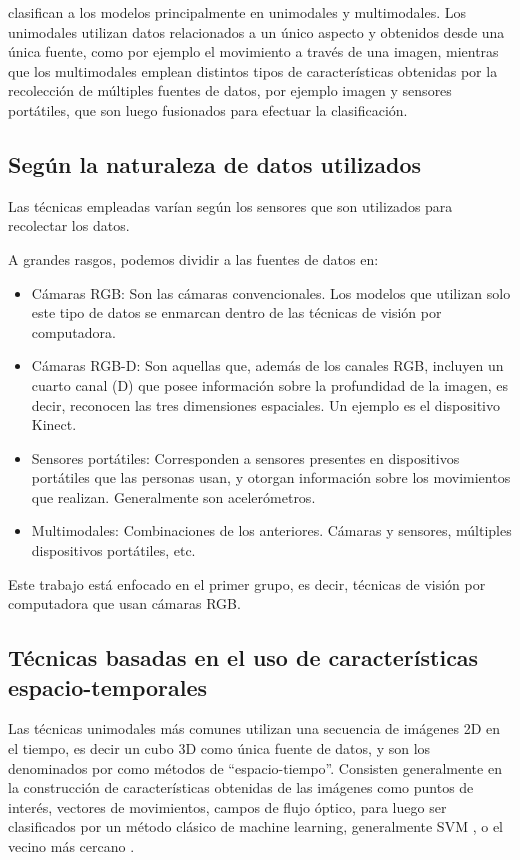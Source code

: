 \citep{Vrigkas2015} clasifican a los modelos principalmente en unimodales y multimodales. Los unimodales utilizan datos relacionados a un único aspecto y obtenidos desde una única fuente, como por ejemplo el movimiento a través de una imagen, mientras que los multimodales emplean distintos tipos de características obtenidas por la recolección de múltiples fuentes de datos, por ejemplo imagen y sensores portátiles, que son luego fusionados para efectuar la clasificación.

\subsection{Según la naturaleza de datos utilizados}

Las técnicas empleadas varían según los sensores que son utilizados para recolectar los datos.

A grandes rasgos, podemos dividir a las fuentes de datos en:

\begin{itemize}
	\item Cámaras RGB: Son las cámaras convencionales. Los modelos que utilizan solo este tipo de datos se enmarcan dentro de las técnicas de visión por computadora.
	\item Cámaras RGB-D: Son aquellas que, además de los canales RGB, incluyen un cuarto canal (D) que posee información sobre la profundidad de la imagen, es decir, reconocen las tres dimensiones espaciales. Un ejemplo es el dispositivo Kinect.
	\item Sensores portátiles: Corresponden a sensores presentes en dispositivos portátiles que las personas usan, y otorgan información sobre los movimientos que realizan. Generalmente son acelerómetros.
	\item Multimodales: Combinaciones de los anteriores. Cámaras y sensores, múltiples dispositivos portátiles, etc. \citep{Yadav2021}
\end{itemize}

Este trabajo está enfocado en el primer grupo, es decir, técnicas de visión por computadora que usan cámaras RGB.

\subsection{Técnicas basadas en el uso de características espacio-temporales}

Las técnicas unimodales más comunes utilizan una secuencia de imágenes 2D en el tiempo, es decir un cubo 3D como única fuente de datos, y son los denominados por \citep{Vrigkas2015} como métodos de “espacio-tiempo”. Consisten generalmente en la construcción de características obtenidas de las imágenes como puntos de interés, vectores de movimientos, campos de flujo óptico, para luego ser clasificados por un método clásico de machine learning, generalmente SVM \citep{wang2010hidden, Schuldt2004, Jhuang2007, Dalal2005}, o el vecino más cercano \citep{Efros2003, Gorelick2007, Vrigkas2014matching}.\\

